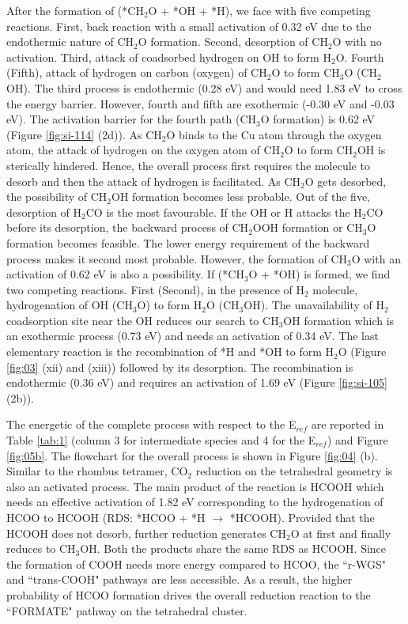 After the formation of (*CH$_2$O + *OH + *H), we face with five competing reactions. First, back reaction with a small activation of 0.32 eV due to the endothermic nature of CH$_2$O formation. Second, desorption of CH$_2$O with no activation. Third, attack of coadsorbed hydrogen on OH to form H$_2$O. Fourth (Fifth), attack of hydrogen on carbon (oxygen) of CH$_2$O to form CH$_3$O (CH$_2$OH). The third process is endothermic (0.28 eV) and would need 1.83 eV to cross the energy barrier. However, fourth and fifth are exothermic (-0.30 eV and -0.03 eV). The activation barrier for the fourth path (CH$_3$O formation) is 0.62 eV (Figure \ref{fig:si-114} (2d)). As CH$_2$O binds to the Cu atom through the oxygen atom, the attack of hydrogen on the oxygen atom of CH$_2$O to form CH$_2$OH is sterically hindered. Hence, the overall process first requires the molecule to desorb and then the attack of hydrogen is facilitated. As CH$_2$O gets desorbed, the possibility of CH$_2$OH formation becomes less probable. Out of the five, desorption of H$_2$CO is the most favourable. If the OH or H attacks the H$_2$CO before its desorption, the backward process of CH$_2$OOH formation or CH$_3$O formation becomes feasible. The lower energy requirement of the backward process makes it second most probable. However, the formation of CH$_3$O with an activation of 0.62 eV is also a possibility. If (*CH$_3$O + *OH) is formed, we find two competing reactions. First (Second), in the presence of H$_2$ molecule, hydrogenation of OH (CH$_3$O) to form H$_2$O (CH$_3$OH). The unavailability of H$_2$ coadsorption site near the OH reduces our search to CH$_3$OH formation which is an exothermic process (0.73 eV) and needs an activation of 0.34 eV. The last elementary reaction is the recombination of *H and *OH to form H$_2$O (Figure \ref{fig:03} (xii) and (xiii)) followed by its desorption. The recombination is endothermic (0.36 eV) and requires an activation of 1.69 eV (Figure \ref{fig:si-105} (2b)). 




The energetic of the complete process with respect to the E$_{ref}$ are reported in Table \ref{tab:1} (column 3 for intermediate species and 4 for the E$_{ref}$) and Figure \ref{fig:05b}. The flowchart for the overall process is shown in Figure \ref{fig:04} (b). Similar to the rhombus tetramer, CO$_2$ reduction on the tetrahedral geometry is also an activated process. The main product of the reaction is HCOOH which needs an effective activation of 1.82 eV corresponding to the hydrogenation of HCOO to HCOOH (RDS: *HCOO + *H $\rightarrow$ *HCOOH). Provided that the HCOOH does not desorb, further reduction generates CH$_2$O at first and finally reduces to CH$_3$OH. Both the products share the same RDS as HCOOH. Since the formation of COOH needs more energy compared to HCOO, the ``r-WGS" and ``trans-COOH" pathways are less accessible. As a result, the higher probability of HCOO formation drives the overall reduction reaction to the ``FORMATE" pathway on the tetrahedral cluster. 


